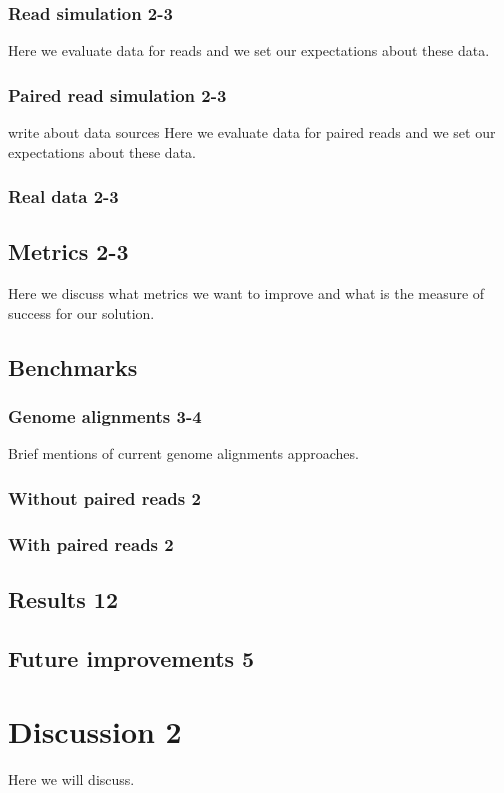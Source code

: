 \subsection{Read simulation 2-3}
Here we evaluate data for reads and we set our expectations about these data.
\subsection{Paired read simulation 2-3}
write about data sources
Here we evaluate data for paired reads and we set our expectations about these data.
\subsection{Real data 2-3}
\section{Metrics 2-3}
Here we discuss what metrics we want to improve and what is the measure of success for our solution.
\section{Benchmarks}
\subsection{Genome alignments 3-4}
Brief mentions of current genome alignments approaches.
\subsection{Without paired reads 2}
\subsection{With paired reads 2}

\section{Results 12}
\section{Future improvements 5}

\chapter{Discussion 2}
Here we will discuss.



